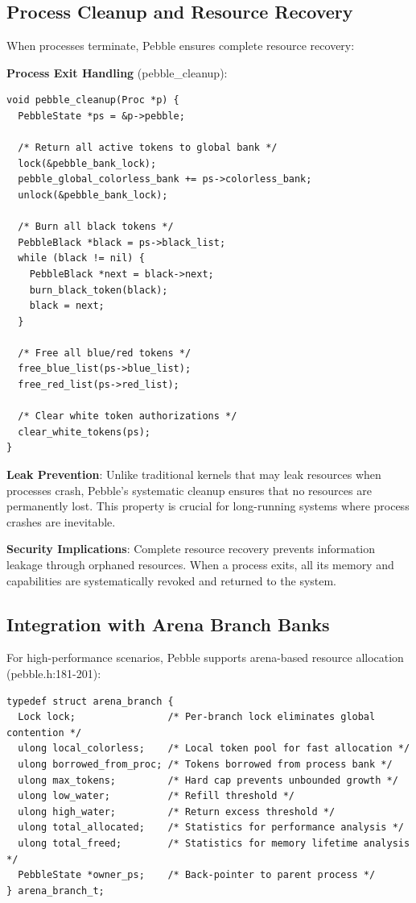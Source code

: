 \documentclass[11pt,letterpaper]{article}
\begin{document}
\subsection{Process Cleanup and Resource Recovery}

When processes terminate, Pebble ensures complete resource recovery:

\textbf{Process Exit Handling} (pebble\_cleanup):

\begin{lstlisting}
void pebble_cleanup(Proc *p) {
  PebbleState *ps = &p->pebble;
  
  /* Return all active tokens to global bank */
  lock(&pebble_bank_lock);
  pebble_global_colorless_bank += ps->colorless_bank;
  unlock(&pebble_bank_lock);
  
  /* Burn all black tokens */
  PebbleBlack *black = ps->black_list;
  while (black != nil) {
    PebbleBlack *next = black->next;
    burn_black_token(black);
    black = next;
  }
  
  /* Free all blue/red tokens */
  free_blue_list(ps->blue_list);
  free_red_list(ps->red_list);
  
  /* Clear white token authorizations */
  clear_white_tokens(ps);
}
\end{lstlisting}

\textbf{Leak Prevention}: Unlike traditional kernels that may leak resources when processes crash, Pebble's systematic cleanup ensures that no resources are permanently lost. This property is crucial for long-running systems where process crashes are inevitable.

\textbf{Security Implications}: Complete resource recovery prevents information leakage through orphaned resources. When a process exits, all its memory and capabilities are systematically revoked and returned to the system.

\subsection{Integration with Arena Branch Banks}

For high-performance scenarios, Pebble supports arena-based resource allocation (pebble.h:181-201):

\begin{lstlisting}
typedef struct arena_branch {
  Lock lock;                /* Per-branch lock eliminates global contention */
  ulong local_colorless;    /* Local token pool for fast allocation */
  ulong borrowed_from_proc; /* Tokens borrowed from process bank */
  ulong max_tokens;         /* Hard cap prevents unbounded growth */
  ulong low_water;          /* Refill threshold */
  ulong high_water;         /* Return excess threshold */
  ulong total_allocated;    /* Statistics for performance analysis */
  ulong total_freed;        /* Statistics for memory lifetime analysis */
  PebbleState *owner_ps;    /* Back-pointer to parent process */
} arena_branch_t;
\end{lstlisting}
\end{document}
